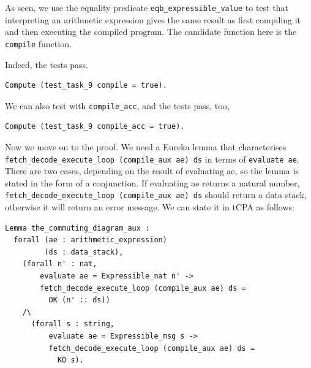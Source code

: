 \documentclass{article}
\begin{document}
As seen, we use the equality predicate \texttt{eqb\_expressible\_value} to test that interpreting an arithmetic expression gives the same result as first compiling it and then executing the compiled program. The candidate function here is the \texttt{compile} function. 

Indeed, the tests pass.

\begin{lstlisting}
Compute (test_task_9 compile = true).
\end{lstlisting}

We can also test with \texttt{compile\_acc}, and the tests pass, too,

\begin{lstlisting}
Compute (test_task_9 compile_acc = true).
\end{lstlisting}

Now we move on to the proof. We need a Eureka lemma that characterises \texttt{fetch\_decode\_execute\_loop (compile\_aux ae) ds} in terms of \texttt{evaluate ae}. There are two cases, depending on the result of evaluating ae, so the lemma is stated in the form of a conjunction. If evaluating ae returns a natural number, \texttt{fetch\_decode\_execute\_loop (compile\_aux ae) ds} should return a data stack, otherwise it will return an error message. We can state it in tCPA as follows:
\begin{lstlisting}
Lemma the_commuting_diagram_aux :
  forall (ae : arithmetic_expression)
         (ds : data_stack),
    (forall n' : nat,
        evaluate ae = Expressible_nat n' ->
        fetch_decode_execute_loop (compile_aux ae) ds =
          OK (n' :: ds))
    /\
      (forall s : string,
          evaluate ae = Expressible_msg s ->
          fetch_decode_execute_loop (compile_aux ae) ds =
            KO s).
\end{lstlisting}
\end{document}
